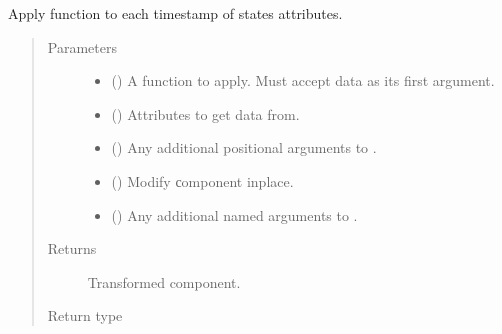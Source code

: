\documentclass[letterpaper,10pt,english]{sphinxmanual}
\begin{document}
\begin{fulllineitems}
\begin{fulllineitems}
\end{fulllineitems}


\begin{fulllineitems}
\label{\detokenize{api/states:geology.src.States.apply}}
Apply function to each timestamp of states attributes.
\begin{quote}\begin{description}
\item[{Parameters}] \leavevmode\begin{itemize}
\item {} 
 () \textendash{} A function to apply. Must accept data as its first argument.

\item {} 
 (\sphinxstyleliteralemphasis{\sphinxupquote{, }}) \textendash{} Attributes to get data from.

\item {} 
 () \textendash{} Any additional positional arguments to .

\item {} 
 () \textendash{} Modify сomponent inplace.

\item {} 
 () \textendash{} Any additional named arguments to .

\end{itemize}

\item[{Returns}] \leavevmode
{} \textendash{} Transformed component.

\item[{Return type}] \leavevmode
{\hyperref[\detokenize{api/states:geology.src.States}]{}}


\end{description}
\end{quote}
\end{fulllineitems}
\end{fulllineitems}
\end{document}
